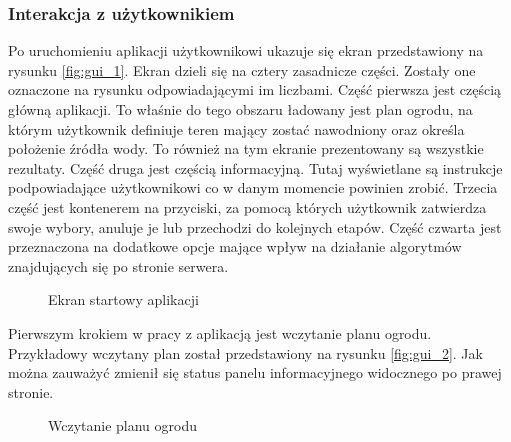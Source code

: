 \documentclass[twoside]{iisthesis}
\begin{document}
\subsubsection{Interakcja z użytkownikiem}
Po uruchomieniu aplikacji użytkownikowi ukazuje się ekran przedstawiony na rysunku \eqref{fig:gui_1}. Ekran dzieli się na cztery zasadnicze części. Zostały one oznaczone na rysunku odpowiadającymi im liczbami. Część pierwsza jest częścią główną aplikacji. To właśnie do tego obszaru ładowany jest plan ogrodu, na którym użytkownik definiuje teren mający zostać nawodniony oraz określa położenie źródła wody. To również na tym ekranie prezentowany są wszystkie rezultaty. Część druga jest częścią informacyjną. Tutaj wyświetlane są instrukcje podpowiadające użytkownikowi co w danym momencie powinien zrobić. Trzecia część jest kontenerem na przyciski, za pomocą których użytkownik zatwierdza swoje wybory, anuluje je lub przechodzi do kolejnych etapów. Część czwarta jest przeznaczona na dodatkowe opcje mające wpływ na działanie algorytmów znajdujących się po stronie serwera.
\begin{figure}[!htb]
	\centering
	\caption{Ekran startowy aplikacji}
	\label{fig:gui_1}
\end{figure}

Pierwszym krokiem w pracy z aplikacją jest wczytanie planu ogrodu. Przykładowy wczytany plan został przedstawiony na rysunku \eqref{fig:gui_2}. Jak można zauważyć zmienił się status panelu informacyjnego widocznego po prawej stronie.
\begin{figure}[!htb]
	\centering
	\caption{Wczytanie planu ogrodu}
	\label{fig:gui_2}
\end{figure}
\end{document}
